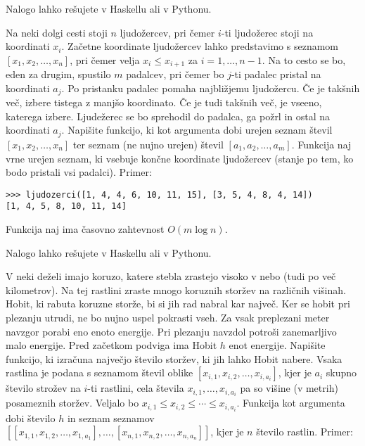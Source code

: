 \documentclass[arhiv]{../izpit}
\begin{document}



Nalogo lahko rešujete v Haskellu ali v Pythonu.

\vspace{0.5\baselineskip}\noindent
Na neki dolgi cesti stoji $n$ ljudožercev, pri čemer $i$-ti ljudožerec stoji na koordinati $x_i$. Začetne koordinate
ljudožercev lahko predstavimo s seznamom $[x_1, x_2, \ldots, x_n]$, pri čemer velja $x_i \leq x_{i+ 1}$ za $i = 1, \ldots, n - 1$.
Na to cesto se bo, eden za drugim, spustilo $m$ padalcev, pri čemer bo $j$-ti padalec pristal na koordinati $a_j$. Po pristanku padalec
pomaha najbližjemu ljudožercu. Če je takšnih več, izbere tistega z manjšo koordinato. Če je tudi takšnih več, je vseeno,
katerega izbere. Ljudežerec se bo sprehodil do padalca, ga požrl in ostal na koordinati $a_j$. Napišite funkcijo, ki kot argumenta
dobi urejen seznam števil $[x_1, x_2, \ldots, x_n]$ ter seznam (ne nujno urejen) števil $[a_1, a_2, \ldots, a_m]$.
Funkcija naj vrne urejen seznam, ki vsebuje končne koordinate ljudožercev (stanje po tem, ko bodo pristali vsi padalci). Primer:

\begin{verbatim}>>> ljudozerci([1, 4, 4, 6, 10, 11, 15], [3, 5, 4, 8, 4, 14])
[1, 4, 5, 8, 10, 11, 14]
\end{verbatim}

\noindent
Funkcija naj ima časovno zahtevnost $O(m \log n)$. 



Nalogo lahko rešujete v Haskellu ali v Pythonu.

\vspace{0.5\baselineskip}\noindent
V neki deželi imajo koruzo, katere stebla zrastejo visoko v nebo (tudi po več kilometrov). Na tej rastlini zraste mnogo
koruznih storžev na različnih višinah. Hobit, ki rabuta koruzne storže, bi si jih rad nabral kar največ. Ker se hobit pri plezanju
utrudi, ne bo nujno uspel pokrasti vseh. Za vsak preplezani meter navzgor porabi eno enoto energije. Pri plezanju navzdol
potroši zanemarljivo malo energije. Pred začetkom podviga ima Hobit $h$ enot energije. Napišite funkcijo, ki izračuna
največjo število storžev, ki jih lahko Hobit nabere. Vsaka rastlina je podana s seznamom števil oblike
$[x_{i,1}, x_{i,2}, \ldots, x_{i, a_i}]$, kjer je $a_i$ skupno število strožev na $i$-ti rastlini, cela števila $x_{i,1}, \ldots, x_{i,a_i}$
pa so višine (v metrih) posameznih storžev. Veljalo bo $x_{i,1} \leq x_{i,2} \leq \cdots \leq x_{i,a_i}$. Funkcija kot argumenta
dobi število $h$ in seznam seznamov $[[x_{1,1}, x_{1,2}, \ldots, x_{1, a_1}], \ldots, [x_{n,1}, x_{n,2}, \ldots, x_{n, a_n}]]$, kjer
je $n$ število rastlin. Primer:
\end{document}
